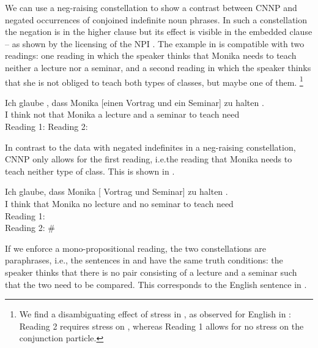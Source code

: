 \documentclass[output=paper]{langsci/langscibook}
\begin{document}
We can use a neg-raising constellation \citep{Horn:78} to show a contrast between CNNP and negated occurrences of conjoined indefinite noun phrases. 
In such a constellation the negation is in the higher clause but its effect is visible in the embedded clause -- as shown by the licensing of the NPI . 
The example in  is compatible with two readings: one reading in which the speaker thinks that Monika needs to teach neither a lecture nor a seminar, and a second reading in which the speaker thinks that she is not obliged to teach both types of classes, but maybe one of them.%
\footnote{We find a disambiguating effect of stress in , as observed for English in \citet[226]{Szabolcsi:Haddican:04}: Reading 2 requires stress on , whereas Reading 1 allows for no stress on the conjunction particle.}

\ea \label{ex-tie-glaub-both}
\gll Ich glaube , dass Monika [einen Vortrag und ein Seminar] zu halten .\\
I think not that Monika \hphantom{[}a lecture and a seminar to teach need\\
\glt Reading 1: 
\glt Reading 2: 
\z 

In contrast to the data with negated indefinites in a neg-raising constellation, CNNP only allows for the first reading, i.e.\@ the reading that Monika needs to teach neither type of class. 
This is shown in .

\ea \label{ex-tie-glaub-neither}
\gll 
Ich glaube, dass Monika [ Vortrag und  Seminar] zu halten .\\
I think that Monika no lecture and no seminar to teach need\\
\glt 
Reading 1: \\
Reading 2: \# 
\z 

If we enforce a mono-propositional reading, the two constellations are paraphrases, i.e., the sentences in  and  have the same truth conditions:  the speaker thinks that there is no pair consisting of a lecture and a seminar such that the two need to be compared. This corresponds to the English sentence in .
\end{document}
